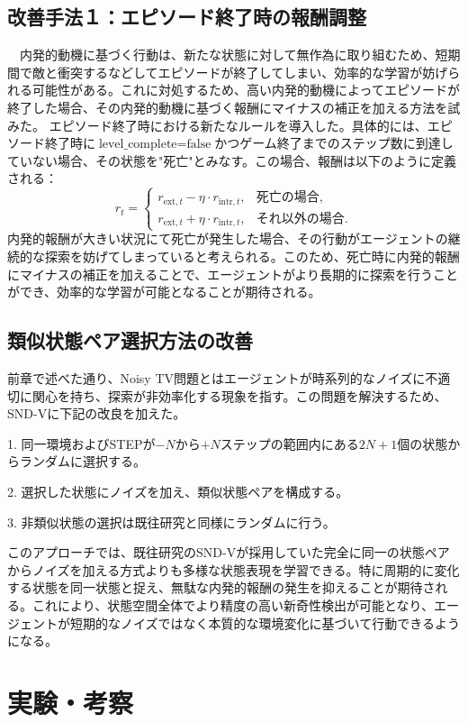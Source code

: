 \subsection{改善手法１：エピソード終了時の報酬調整}
　内発的動機に基づく行動は、新たな状態に対して無作為に取り組むため、短期間で敵と衝突するなどしてエピソードが終了してしまい、効率的な学習が妨げられる可能性がある。これに対処するため、高い内発的動機によってエピソードが終了した場合、その内発的動機に基づく報酬にマイナスの補正を加える方法を試みた。
エピソード終了時における新たなルールを導入した。具体的には、エピソード終了時に\(\text{level\_complete} = \text{false}\)かつゲーム終了までのステップ数に到達していない場合、その状態を"死亡"とみなす。この場合、報酬は以下のように定義される：
\[
 r_t = \begin{cases}
 r_{\text{ext}, t} - \eta \cdot r_{\text{intr}, t}, & \text{死亡の場合},\\
 r_{\text{ext}, t} + \eta \cdot r_{\text{intr}, t}, & \text{それ以外の場合}.
\end{cases}
\]
内発的報酬が大きい状況にて死亡が発生した場合、その行動がエージェントの継続的な探索を妨げてしまっていると考えられる。このため、死亡時に内発的報酬にマイナスの補正を加えることで、エージェントがより長期的に探索を行うことができ、効率的な学習が可能となることが期待される。


\subsection{類似状態ペア選択方法の改善}
前章で述べた通り、Noisy TV問題とはエージェントが時系列的なノイズに不適切に関心を持ち、探索が非効率化する現象を指す。この問題を解決するため、SND-Vに下記の改良を加えた。

1. 同一環境およびSTEPが\(-N\)から\(+N\)ステップの範囲内にある\(2N+1\)個の状態からランダムに選択する。

2. 選択した状態にノイズを加え、類似状態ペアを構成する。

3. 非類似状態の選択は既往研究と同様にランダムに行う。

このアプローチでは、既往研究のSND-Vが採用していた完全に同一の状態ペアからノイズを加える方式よりも多様な状態表現を学習できる。特に周期的に変化する状態を同一状態と捉え、無駄な内発的報酬の発生を抑えることが期待される。これにより、状態空間全体でより精度の高い新奇性検出が可能となり、エージェントが短期的なノイズではなく本質的な環境変化に基づいて行動できるようになる。

\section{実験・考察}

